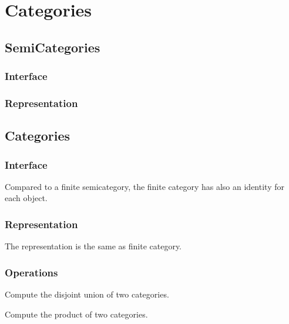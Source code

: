 \chapter{Categories}


\section{SemiCategories}
\subsection*{Interface}

\subsection*{Representation}


\section{Categories}
\subsection*{Interface}
Compared to a finite semicategory, the finite category
has also an identity for each object.

\subsection*{Representation}

The representation is the same as finite category.

\subsection*{Operations}

\begin{exercise}
Compute the disjoint union of two categories.

\end{exercise}

\begin{exercise}
Compute the product of two categories.

\end{exercise}


